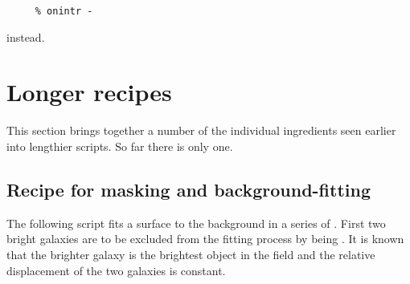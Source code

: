 \small
\begin{verbatim}
     % onintr -
\end{verbatim}
\normalsize
instead.

\newpage
\section{Longer recipes
\label{sc4_se_long_recipes}}

This section brings together a number of the individual ingredients
seen earlier into lengthier scripts.  So far there is only one.

\subsection{Recipe for masking and background-fitting
\label{sc4_se_long1}}

The following script fits a surface to the background in a series of
. 
First two bright galaxies are to be excluded from the fitting process by
being .  It is known that the brighter
galaxy is the brightest object in the field and the relative
displacement of the two galaxies is constant.

